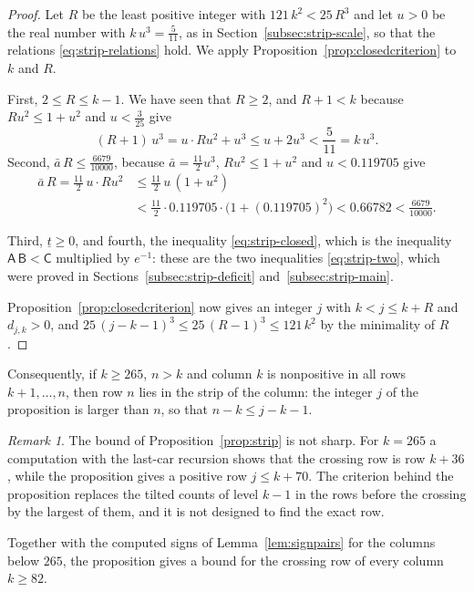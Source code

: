 \documentclass{amsart}
\theoremstyle{definition}
\theoremstyle{remark}
\newtheorem*{remark}{Remark}
\numberwithin{equation}{section}
\begin{document}
\begin{proof}
Let $R$ be the least positive integer with $121\,k^2<25\,R^3$ and let $u>0$ be the real number with $k\,u^3=\frac{5}{11}$, as in Section~\ref{subsec:strip-scale}, so that the relations \eqref{eq:strip-relations} hold. We apply Proposition~\ref{prop:closedcriterion} to $k$ and $R$.

First, $2\le R\le k-1$. We have seen that $R\ge 2$, and $R+1<k$ because $Ru^2\le 1+u^2$ and $u<\frac{3}{25}$ give
\[
(R+1)\,u^3=u\cdot Ru^2+u^3\le u+2u^3<\frac{5}{11}=k\,u^3.
\]
Second, $\bar a\,R\le\frac{6679}{10000}$, because $\bar a=\frac{11}{2}u^3$, $Ru^2\le 1+u^2$ and $u<0.119705$ give
\begin{align*}
\bar a\,R=\frac{11}{2}\,u\cdot Ru^2&\le\frac{11}{2}\,u\,(1+u^2)\\
&<\frac{11}{2}\cdot 0.119705\cdot\bigl(1+(0.119705)^2\bigr)<0.66782<\frac{6679}{10000}.
\end{align*}

Third, $\underline t\ge 0$, and fourth, the inequality \eqref{eq:strip-closed}, which is the inequality $\mathsf{A}\,\mathsf{B}<\mathsf{C}$ multiplied by $e^{-1}$: these are the two inequalities \eqref{eq:strip-two}, which were proved in Sections~\ref{subsec:strip-deficit} and~\ref{subsec:strip-main}.

Proposition~\ref{prop:closedcriterion} now gives an integer $j$ with $k<j\le k+R$ and $d_{j,k}>0$, and $25\,(j-k-1)^3\le 25\,(R-1)^3\le 121\,k^2$ by the minimality of $R$.
\end{proof}

Consequently, if $k\ge 265$, $n>k$ and column $k$ is nonpositive in all rows $k+1,\dots,n$, then row $n$ lies in the strip of the column: the integer $j$ of the proposition is larger than $n$, so that $n-k\le j-k-1$.

\begin{remark}
The bound of Proposition~\ref{prop:strip} is not sharp. For $k=265$ a computation with the last-car recursion shows that the crossing row is row $k+36$, while the proposition gives a positive row $j\le k+70$. The criterion behind the proposition replaces the tilted counts of level $k-1$ in the rows before the crossing by the largest of them, and it is not designed to find the exact row.
\end{remark}

Together with the computed signs of Lemma~\ref{lem:signpairs} for the columns below $265$, the proposition gives a bound for the crossing row of every column $k\ge 82$.
\end{document}
